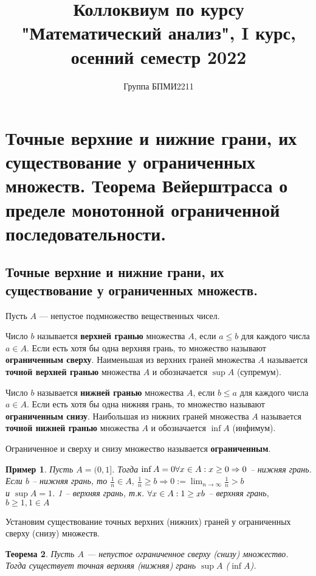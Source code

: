 \documentclass[12pt]{article}
\title{Коллоквиум по курсу "Математический анализ", I курс, осенний семестр 2022}
\author{Группа БПМИ2211}
\newtheorem{theorem}{Теорема}%
\newtheorem{example}[theorem]{Пример}
\theoremstyle{definition}
\begin{document}
\maketitle

\section{Точные верхние и нижние грани, их существование у ограниченных множеств. Теорема Вейерштрасса о пределе монотонной ограниченной последовательности.}
\subsection{Точные верхние и нижние грани, их существование у ограниченных множеств.}
Пусть $A$ --- непустое подмножество вещественных чисел.

Число $b$ называется {\bf верхней гранью} множества $A$,
если $a\le b$ для каждого числа $a\in A$.
Если есть хотя бы одна верхняя грань, то множество называют {\bf ограниченным сверху}.
Наименьшая из верхних граней множества $A$ называется {\bf точной верхней гранью} множества $A$
и обозначается $\sup A$ (супремум).

Число $b$ называется {\bf нижней гранью} множества $A$,
если $b\le a$ для каждого числа $a\in A$.
Если есть хотя бы одна нижняя грань, то множество называют {\bf ограниченным снизу}.
Наибольшая из нижних граней множества $A$ называется {\bf точной нижней гранью} множества $A$
и обозначается $\inf A$ (инфимум).

Ограниченное и сверху и снизу множество называется {\bf ограниченным}.
\begin{example}
{\rm
Пусть $A=(0,1]$.
Тогда $\inf A = 0 \\ \forall x \in A: x \geq 0 \Rightarrow 0$ -- нижняя грань. Если $b$ -- нижняя грань, то $\frac{1}{n} \in A,\ \frac{1}{n} \geq b \Rightarrow 0 := \lim_{n\to\infty}\frac{1}{n} > b$ \\ 
и $\sup A = 1$. 1 -- верхняя грань, т.к. $\forall x \in A: 1 \geq x \\ b$ -- верхняя грань, $b \geq 1, 1\in A$
}\end{example}
Установим существование точных верхних (нижних)
граней у ограниченных сверху (снизу) множеств.

\begin{theorem}
Пусть $A$ --- непустое ограниченное сверху (снизу)
множество. Тогда существует точная верхняя (нижняя)
грань $\sup A$ ($\inf A$).
\end{theorem}
\end{document}
